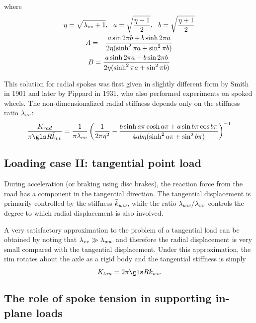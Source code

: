 \documentclass[\rootdir/thesis.tex]{subfiles}
\begin{document}
where
\begin{gather*}
\eta=\sqrt{\lambda_{vv} + 1}, \,\,\,\, a=\sqrt{\frac{\eta-1}{2}}, \,\,\,\, b=\sqrt{\frac{\eta+1}{2}}\\
A = -\frac{a\sin{2\pi b} + b\sinh{2\pi a}}{2\eta(\sinh^2{\pi a} + \sin^2{\pi b})}\\
B =  \frac{a\sinh{2\pi a} - b\sin{2\pi b}}{2\eta(\sinh^2{\pi a} + \sin^2{\pi b})}
\end{gather*}

This solution for radial spokes was first given in slightly different form by Smith \cite{Smith1901} in 1901 and later by Pippard \cite{Pippard1931} in 1931, who also performed experiments on spoked wheels. The non-dimensionalized radial stiffness depends only on the stiffness ratio $\lambda_{vv}$:
\begin{equation}
\label{eq:Krad}
\frac{K_{rad}}{\pi\R\bar{k}_{vv}} =
    \frac{1}{\pi\lr_{vv}} \left(\frac{1}{2\pi\eta^2}
                                    -\frac{b\sinh{a\pi}\cosh{a\pi} + a\sin{b\pi}\cos{b\pi}}
                                     {4ab\eta (\sinh^2{a\pi} + \sin^2{b\pi})} \right)^{-1}
\end{equation}

\subsection{Loading case II: tangential point load}

During acceleration (or braking using disc brakes), the reaction force from the road has a component in the tangential direction. The tangential displacement is primarily controlled by the stiffness $\bar{k}_{ww}$, while the ratio $\lambda_{ww}/\lambda_{vv}$ controls the degree to which radial displacement is also involved.

A very satisfactory approximation to the problem of a tangential load can be obtained by noting that $\lambda_{vv}\gg\lambda_{ww}$ and therefore the radial displacement is very small compared with the tangential displacement. Under this approximation, the rim rotates about the axle as a rigid body and the tangential stiffness is simply
\begin{equation}
\label{eq:Ktan}
K_{tan} = 2\pi\R \kww
\end{equation}

\subsection{The role of spoke tension in supporting in-plane loads}
\end{document}
